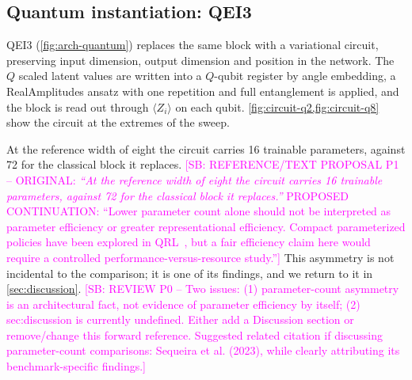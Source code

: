 \documentclass[aps,floatfix,superscriptaddress,twocolumn,tightenlines,amsmath,amssymb,nofootinbib,10pt,longbibliography,prl]{revtex4-2}
\newcommand{\sam}[1]{\textcolor{magenta}{[SB: {#1}]}}
\begin{document}

\subsection{Quantum instantiation: QEI3}
\label{subsec:arch-quantum}

QEI3 (\ref{fig:arch-quantum}) replaces the same block with a variational circuit, preserving input dimension, output dimension and position in the network. The $Q$ scaled latent values are written into a $Q$-qubit register by angle embedding, a RealAmplitudes ansatz with one repetition and full entanglement is applied, and the block is read out through $\langle Z_i \rangle$ on each qubit. \ref{fig:circuit-q2,fig:circuit-q8} show the circuit at the extremes of the sweep.

At the reference width of eight the circuit carries \num{16} trainable parameters, against \num{72} for the classical block it replaces.
\sam{REFERENCE/TEXT PROPOSAL P1 -- ORIGINAL: \textit{``At the reference width of eight the circuit carries \num{16} trainable parameters, against \num{72} for the classical block it replaces.''} PROPOSED CONTINUATION: ``Lower parameter count alone should not be interpreted as parameter efficiency or greater representational efficiency. Compact parameterized policies have been explored in QRL~\cite{Jerbi2021ParametrizedQuantumP,Sequeira2023Policygradientsusing}, but a fair efficiency claim here would require a controlled performance-versus-resource study.''} This asymmetry is not incidental to the comparison; it is one of its findings, and we return to it in \ref{sec:discussion}.
\sam{REVIEW P0 -- Two issues: (1) parameter-count asymmetry is an architectural fact, not evidence of parameter efficiency by itself; (2) sec:discussion is currently undefined. Either add a Discussion section or remove/change this forward reference. Suggested related citation if discussing parameter-count comparisons: Sequeira et al. (2023), while clearly attributing its benchmark-specific findings.}
\end{document}
